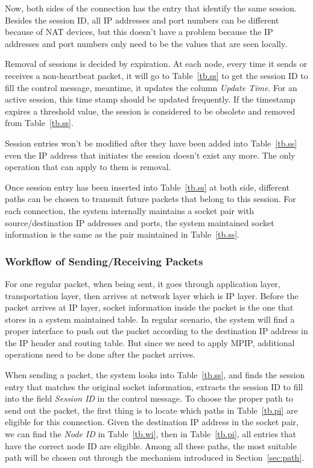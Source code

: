 Now, both sides of the connection has the entry that identify the same session. Besides the session ID, all IP addresses and port numbers can be different because of NAT devices, but this doesn't have a problem because the IP addresses and port numbers only need to be the values that are seen locally.

Removal of sessions is decided by expiration. At each node, every time it sends or receives a non-heartbeat packet, it will go to Table~\ref{tb.ss} to get the session ID to fill the control message, meantime, it updates the column \emph{Update Time}. For an active session, this time stamp should be updated frequently. If the timestamp expires a threshold value, the session is considered to be obsolete and removed from Table~\ref{tb.ss}.

Session entries won't be modified after they have been added into Table~\ref{tb.ss} even the IP address that initiates the session doesn't exist any more. The only operation that can apply to them is removal. 

Once session entry has been inserted into Table~\ref{tb.ss} at both side, different paths can be chosen to transmit future packets that belong to this session. For each connection, the system internally maintains a socket pair with source/destination IP addresses and ports, the system maintained socket information is the same as the pair maintained in Table~\ref{tb.ss}. 

\subsubsection{Workflow of Sending/Receiving Packets}

For one regular packet, when being sent, it goes through application layer, transportation layer, then arrives at network layer which is IP layer. Before the packet arrives at IP layer, socket information inside the packet is the one that stores in a system maintained table. In regular scenario, the system will find a proper interface to push out the packet according to the destination IP address in the IP header and routing table. But since we need to apply MPIP, additional operations need to be done after the packet arrives.

When sending a packet, the system looks into Table~\ref{tb.ss}, and finds the session entry that matches the original socket information, extracts the session ID to fill into the field \emph{Session ID} in the control message. To choose the proper path to send out the packet, the first thing is to locate which paths in Table~\ref{tb.pi} are eligible for this connection. Given the destination IP address in the socket pair, we can find the \emph{Node ID} in Table~\ref{tb.wi}, then in Table~\ref{tb.pi}, all entries that have the correct node ID are eligible. Among all these paths, the most suitable path will be chosen out through the mechanism introduced in Section~\ref{sec:path}. 

